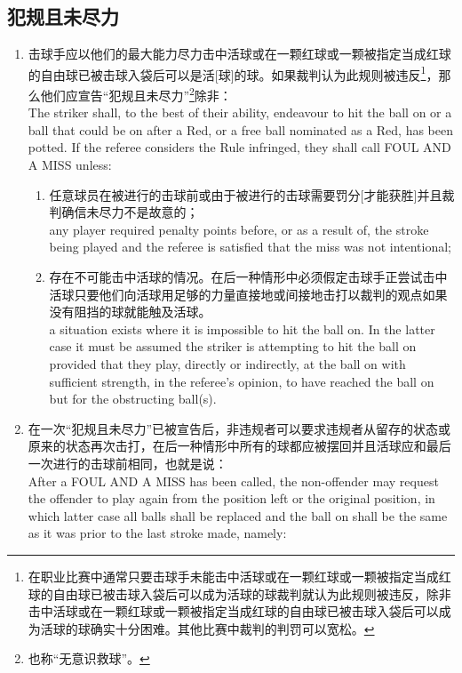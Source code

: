 \subsection{犯规且未尽力}\label{22314}

\begin{enumerate}[label=(\alph*)]
    \item \label{22314a}击球手应以他们的最大能力尽力击中活球或在一颗红球或一颗被指定当成红球的自由球已被击球入袋后可以是活[球]的球。如果裁判认为此规则被违反\footnote{在职业比赛中通常只要击球手未能击中活球或在一颗红球或一颗被指定当成红球的自由球已被击球入袋后可以成为活球的球裁判就认为此规则被违反，除非击中活球或在一颗红球或一颗被指定当成红球的自由球已被击球入袋后可以成为活球的球确实十分困难。其他比赛中裁判的判罚可以宽松。}，那么他们应宣告``犯规且未尽力''\footnote{也称``无意识救球''。}除非：\\
    The striker shall, to the best of their ability, endeavour to hit the ball on or a ball that could be on after a Red, or a free ball nominated as a Red, has been potted. If the referee considers the Rule infringed, they shall call FOUL AND A MISS unless:
    \begin{enumerate}[label=(\roman*)]
        \item \label{22314ai}任意球员在被进行的击球前或由于被进行的击球需要罚分[才能获胜]并且裁判确信未尽力不是故意的；\\
        any player required penalty points before, or as a result of, the stroke being played and the referee is satisfied that the miss was not intentional;
        \item 存在不可能击中活球的情况。在后一种情形中必须假定击球手正尝试击中活球只要他们向活球用足够的力量直接地或间接地击打以裁判的观点如果没有阻挡的球就能触及活球。\\
        a situation exists where it is impossible to hit the ball on. In the latter case it must be assumed the striker is attempting to hit the ball on provided that they play, directly or indirectly, at the ball on with sufficient strength, in the referee's opinion, to have reached the ball on but for the obstructing ball(s). 
    \end{enumerate}
    \item \label{22314b}在一次``犯规且未尽力''已被宣告后，非违规者可以要求违规者从留存的状态或原来的状态再次击打，在后一种情形中所有的球都应被摆回并且活球应和最后一次进行的击球前相同，也就是说：\\
    After a FOUL AND A MISS has been called, the non-offender may request the offender to play again from the position left or the original position, in which latter case all balls shall be replaced and the ball on shall be the same as it was prior to the last stroke made, namely: 

\end{enumerate}
